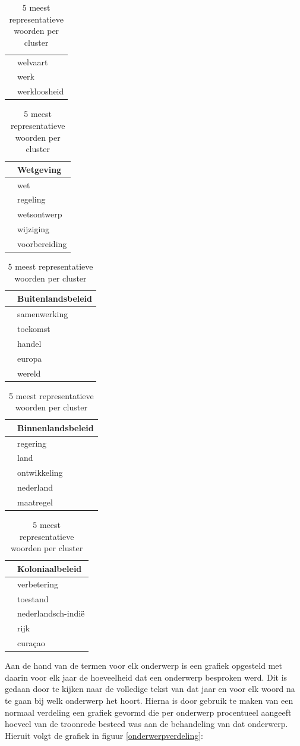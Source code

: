 \begin{table}[H]
\begin{tabular}{ll}
 &         welvaart \\
 &             werk \\
 &     werkloosheid \\
\bottomrule
\end{tabular}
\begin{tabular}{ll}
\toprule
{} &              Wetgeving \\
\midrule
 &            wet \\
 &       regeling \\
 &    wetsontwerp \\
 &      wijziging \\
 &  voorbereiding \\
\bottomrule
\end{tabular}
\begin{tabular}{ll}
\toprule
{} &             Buitenlandsbeleid \\
\midrule
 &  samenwerking \\
 &      toekomst \\
 &        handel \\
 &        europa \\
 &        wereld \\
\bottomrule
\end{tabular}
\begin{tabular}{ll}
\toprule
{} &             Binnenlandsbeleid \\
\midrule
 &      regering \\
 &          land \\
 &  ontwikkeling \\
 &     nederland \\
 &     maatregel \\
\bottomrule
\end{tabular}
\begin{tabular}{ll}
\toprule
{} &                  Koloniaalbeleid \\
\midrule
  &        verbetering \\
  &           toestand \\
  &             nederlandsch-indië \\
  &               rijk \\
  &              curaçao \\
\bottomrule
\end{tabular}
\caption{5 meest representatieve woorden per cluster}
\label{clusters}
\end{table}

Aan de hand van de termen voor elk onderwerp is een grafiek opgesteld met daarin voor elk jaar de hoeveelheid dat een onderwerp besproken werd. Dit is gedaan door te kijken naar de volledige tekst van dat jaar en voor elk woord na te gaan bij welk onderwerp het hoort. Hierna is door gebruik te maken van een normaal verdeling een grafiek gevormd die per onderwerp procentueel aangeeft hoeveel van de troonrede besteed was aan de behandeling van dat onderwerp. Hieruit volgt de grafiek in figuur \ref{onderwerpverdeling}: 

